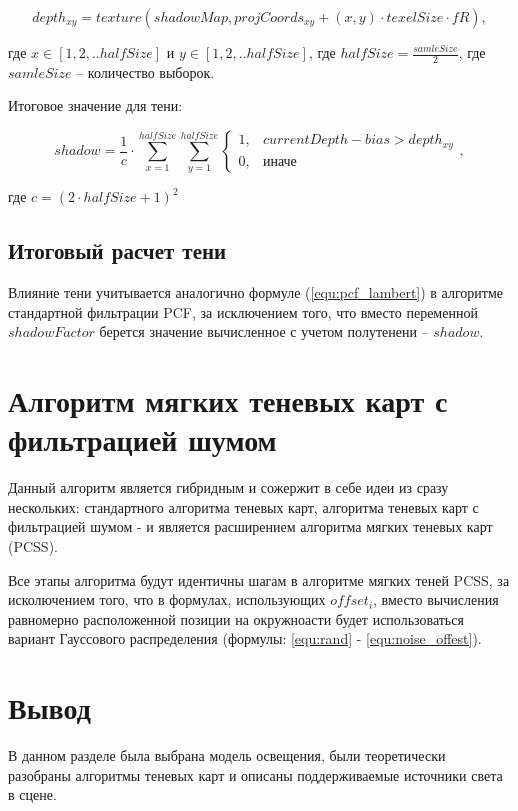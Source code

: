 \begin{equation}
    \label{equ:depth_pcss}
    depth_{xy} = texture(shadowMap, projCoords_{xy} + (x,y) \cdot texelSize \cdot fR),
\end{equation}

\noindent где $x \in [1, 2, .. halfSize]$ и $y \in [1, 2, .. halfSize]$, где $halfSize = \frac{samleSize}{2}$,
где $samleSize$ -- количество выборок.

Итоговое значение для тени:

\begin{equation}
    \label{equ:pcf_pcss}
    shadow = \frac{1}{c} \cdot \sum_{x = 1}^{halfSize}\sum_{y = 1}^{halfSize}
    \begin{cases}
        1, & \text{$currentDepth - bias > depth_{xy}$} \\
        0, & \text{иначе}
    \end{cases},
\end{equation}

\noindent где $c = (2 \cdot halfSize + 1)^{2}$

\subsection*{Итоговый расчет тени}

Влияние тени учитывается аналогично формуле (\ref{equ:pcf_lambert}) в алгоритме
стандартной фильтрации PCF, за исключением того, что вместо переменной $shadowFactor$
берется значение вычисленное с учетом полутенени -- $shadow$.

\section{Алгоритм мягких теневых карт с фильтрацией шумом}

Данный алгоритм является гибридным и сожержит в себе идеи из
сразу нескольких: стандартного алгоритма теневых карт,
алгоритма теневых карт с фильтрацией шумом - и является
расширением алгоритма мягких теневых карт (PCSS).

Все этапы алгоритма будут идентичны шагам в алгоритме мягких
теней PCSS, за исколючением того, что в формулах, использующих
$offset_i$, вместо вычисления равномерно расположенной позиции на окружноасти
будет использоваться вариант Гауссового распределения (формулы: \ref{equ:rand} - \ref{equ:noise_offest}).

\section*{Вывод}

В данном разделе была выбрана модель освещения,
были теоретически разобраны алгоритмы теневых карт и
описаны поддерживаемые источники света в сцене.


